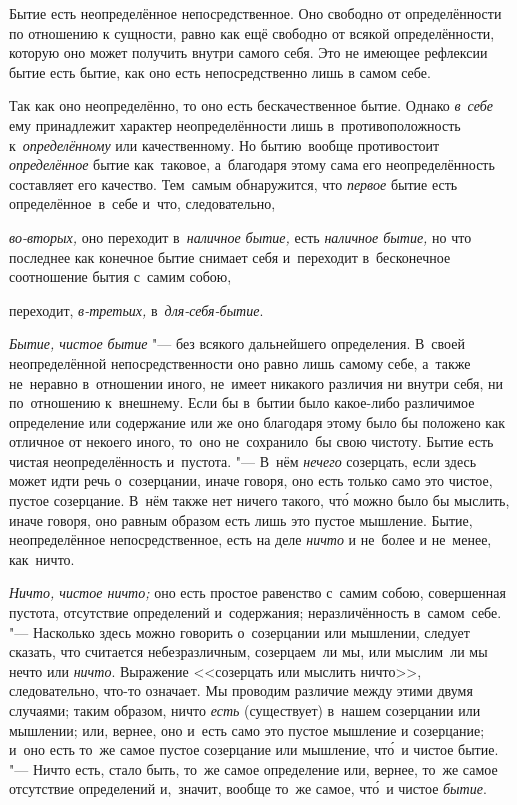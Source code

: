 Бытие есть неопределённое непосредственное. Оно свободно от определённости по
отношению к сущности, равно как ещё свободно от всякой определённости, которую
оно может получить внутри самого себя. Это не имеющее рефлексии бытие есть
бытие, как оно есть непосредственно лишь в самом себе.

Так как оно неопределённо, то оно есть бескачественное бытие. Однако
{\em в~себе} ему принадлежит характер неопределённости лишь в~противоположность
к~{\em определённому} или качественному. Но бытию~вообще противостоит
{\em определённое} бытие как~таковое, а~благодаря этому сама его
неопределённость составляет его качество. Тем~самым обнаружится, что
{\em первое} бытие есть определённое~в~себе и~что, следовательно,

{\em во-вторых,} оно переходит в~{\em наличное бытие,} есть
{\em наличное бытие,} но что последнее как конечное бытие снимает себя
и~переходит в~бесконечное соотношение бытия с~самим собою,

переходит, {\em в-третьих,} в~{\em для-себя-бытие}.



{\em Бытие, чистое бытие} "--- без всякого дальнейшего определения.
В~своей неопределённой непосредственности оно равно лишь самому себе, а~также
не~неравно в~отношении иного, не~имеет никакого различия ни внутри себя, ни
по~отношению к~внешнему. Если бы в~бытии было какое-либо различимое определение
или содержание или же оно благодаря этому было бы положено как отличное от
некоего иного, то~оно не~сохранило~бы свою чистоту. Бытие есть чистая
неопределённость и~пустота. "--- В~нём {\em нечего} созерцать, если здесь может
идти речь о~созерцании, иначе говоря, оно есть только само это чистое, пустое
созерцание. В~нём также нет ничего такого, чт\'{о} можно было бы мыслить, иначе
говоря, оно равным образом есть лишь это пустое мышление. Бытие, неопределённое
непосредственное, есть на деле {\em ничто} и не~более и не~менее, как~ничто.


{\em Ничто, чистое ничто;} оно есть простое равенство с~самим собою,
совершенная пустота, отсутствие определений и~содержания; неразличённость
в~самом~себе. "--- Насколько здесь можно говорить о~созерцании или мышлении,
следует сказать, что считается небезразличным, созерцаем~ли мы, или мыслим~ли
мы нечто или {\em ничто}. Выражение <<созерцать или мыслить ничто>>,
следовательно, что-то означает. Мы проводим различие между этими двумя
случаями; таким образом, ничто {\em есть} (существует) в~нашем созерцании или
мышлении; или, вернее, оно и~есть само это пустое мышление и созерцание; и~оно
есть то~же самое пустое созерцание или мышление, чт\'{о}~и чистое бытие. "---
Ничто есть, стало быть, то~же самое определение или, вернее, то~же самое
отсутствие определений и,~значит, вообще то~же самое,
чт\'{о}~и чистое {\em бытие}.

